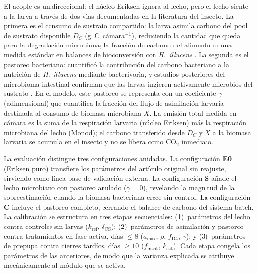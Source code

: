 El acople es unidireccional: el n\'{u}cleo Eriksen ignora al lecho, pero
el lecho siente a la larva a trav\'{e}s de dos v\'{\i}as documentadas en
la literatura del insecto. La primera es el consumo de sustrato
compartido: la larva asimila carbono del pool de sustrato disponible
$D_C$ (g~C~c\'{a}mara$^{-1}$), reduciendo la cantidad que queda para la
degradaci\'{o}n microbiana; la fracci\'{o}n de carbono del alimento es
una medida est\'{a}ndar en balances de bioconversi\'{o}n con
\textit{H.~illucens} \parencite{eriksenDynamicModellingFeed2022}. La
segunda es el pastoreo bacteriano:
\textcite{douilletCarbonContributionBacterivory1993} cuantific\'{o} la
contribuci\'{o}n del carbono bacteriano a la nutrici\'{o}n de
\textit{H.~illucens} mediante bacterivor\'{\i}a, y estudios posteriores
del microbioma intestinal confirman que las larvas ingieren activamente
microbios del sustrato
\parencite{klammsteinerCoreGutMicrobiome2020,%
brunoIntestinalMicrobiotaHermetia2019,%
wynantsAssessingMicrobiotaBlack2019}. En el modelo, este pastoreo se
representa con un coeficiente $\gamma$ (adimensional) que cuantifica la
fracci\'{o}n del flujo de asimilaci\'{o}n larvaria destinada al consumo
de biomasa microbiana $X$. La emisi\'{o}n total medida en c\'{a}mara es
la suma de la respiraci\'{o}n larvaria (n\'{u}cleo Eriksen) m\'{a}s la
respiraci\'{o}n microbiana del lecho (Monod); el carbono transferido
desde $D_C$ y $X$ a la biomasa larvaria se acumula en el insecto y no se
libera como CO$_2$ inmediato.

La evaluación distingue tres configuraciones anidadas. La configuración
\textbf{E0} (Eriksen puro) transfiere los parámetros del artículo original
sin reajuste, sirviendo como línea base de validación externa. La
configuración \textbf{S} añade el lecho microbiano con pastoreo anulado
($\gamma = 0$), revelando la magnitud de la sobreestimación cuando la
biomasa bacteriana crece sin control. La configuración \textbf{C} incluye
el pastoreo completo, cerrando el balance de carbono del sistema batch. La
calibración se estructura en tres etapas secuenciales: (1)~parámetros del
lecho contra controles sin larvas ($k_{\mathrm{ref}}$,
$\delta_{\mathrm{CS}}$); (2)~parámetros de asimilación y pastoreo contra
tratamientos en fase activa, días $\leq 8$ ($a_{\max}$, $\rho$,
$f_{\mathrm{D4}}$, $\gamma$); y (3)~parámetros de prepupa contra cierres
tardíos, días $\geq 10$ ($f_{\mathrm{mant}}$, $k_{\mathrm{cat}}$). Cada
etapa congela los parámetros de las anteriores, de modo que la varianza
explicada se atribuye mecánicamente al módulo que se activa.

